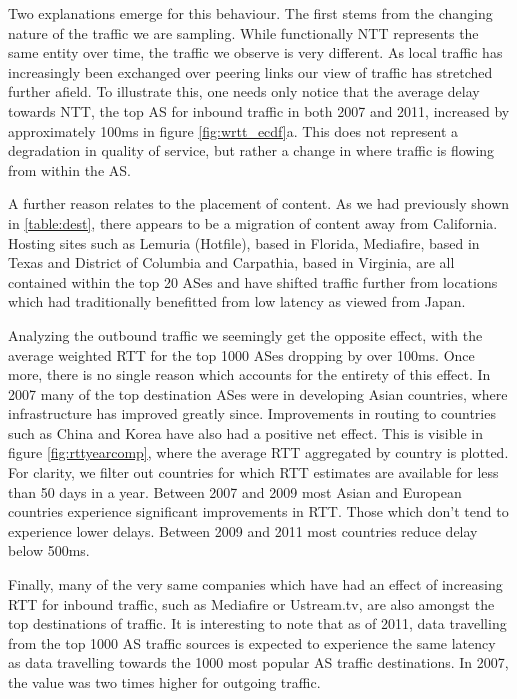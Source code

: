 Two explanations emerge for this behaviour. The first stems from the changing nature of the traffic we are sampling. While functionally NTT represents the same entity over time, the traffic we observe is very different. As local traffic has increasingly been exchanged over peering links our view of traffic has stretched further afield. To illustrate this, one needs only notice that the average delay towards NTT, the top AS for inbound traffic in both 2007 and 2011, increased by approximately 100ms in figure \ref{fig:wrtt_ecdf}a. This does not represent a degradation in quality of service, but rather a change in where traffic is flowing from within the AS.

A further reason relates to the placement of content. As we had previously shown in \ref{table:dest}, there appears to be a migration of content away from California. Hosting sites such as Lemuria (Hotfile), based in Florida, Mediafire, based in Texas and District of Columbia and Carpathia, based in Virginia, are all contained within the top 20 ASes and have shifted traffic further from locations which had traditionally benefitted from low latency as viewed from Japan.

Analyzing the outbound traffic we seemingly get the opposite effect, with the average weighted RTT for the top 1000 ASes dropping by over 100ms. Once more, there is no single reason which accounts for the entirety of this effect. In 2007 many of the top destination ASes were in developing Asian countries, where infrastructure has improved greatly since. Improvements in routing to countries such as China and Korea have also had a positive net effect. This is visible in figure \ref{fig:rttyearcomp}, where the average RTT aggregated by country is plotted. For clarity, we filter out countries for which RTT estimates are available for less than 50 days in a year. Between 2007 and 2009 most Asian and European countries experience significant improvements in RTT. Those which don't tend to experience lower delays. Between 2009 and 2011 most countries reduce delay below 500ms. 

Finally, many of the very same companies which have had an effect of increasing RTT for inbound traffic, such as Mediafire or Ustream.tv, are also amongst the top destinations of traffic. It is interesting to note that as of 2011, data travelling from the top 1000 AS traffic sources is expected to experience the same latency as data travelling towards the 1000 most popular AS traffic destinations. In 2007, the value was two times higher for outgoing traffic.


